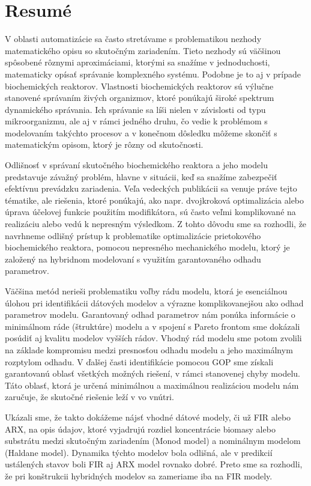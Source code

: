 \chapter{Resumé}
V oblasti automatizácie sa často stretávame s problematikou nezhody matematického opisu so skutočným zariadením. Tieto nezhody sú väčšinou spôsobené rôznymi aproximáciami, ktorými sa snažíme v jednoduchosti, matematicky opísať správanie komplexného systému. Podobne je to aj v prípade biochemických reaktorov. Vlastnosti biochemických reaktorov sú výlučne stanovené správaním živých organizmov, ktoré ponúkajú široké spektrum dynamického správania. Ich správanie sa líši nielen v závislosti od typu mikroorganizmu, ale aj v rámci jedného druhu, čo vedie k problémom s modelovaním takýchto procesov a v konečnom dôsledku môžeme skončiť s matematickým opisom, ktorý je rôzny od skutočnosti. 

Odlišnosť v správaní skutočného biochemického reaktora a jeho modelu predstavuje závažný problém, hlavne v situácii, keď sa snažíme zabezpečiť efektívnu prevádzku zariadenia. Veľa vedeckých publikácii sa venuje práve tejto tématike, ale riešenia, ktoré ponúkajú, ako napr. dvojkroková optimalizácia alebo úprava účelovej funkcie použitím modifikátora, sú často veľmi komplikované na realizáciu alebo vedú k nepresným výsledkom. Z tohto dôvodu sme sa rozhodli, že navrhneme odlišný prístup k problematike optimalizácie prietokového biochemického reaktora, pomocou nepresného mechanického modelu, ktorý je založený na hybridnom modelovaní s využitím garantovaného odhadu parametrov.

Väčšina metód nerieši problematiku voľby rádu modelu, ktorá je esenciálnou úlohou pri identifikácii dátových modelov a výrazne komplikovanejšou ako odhad parametrov modelu. Garantovaný odhad parametrov nám ponúka informácie o minimálnom ráde (štruktúre) modelu a v spojení s Pareto frontom sme dokázali posúdiť aj kvalitu modelov vyšších rádov. Vhodný rád modelu sme potom zvolili na základe kompromisu medzi presnosťou odhadu modelu a jeho maximálnym rozptylom odhadu. V ďalšej časti identifikácie pomocou GOP sme získali garantovanú oblasť všetkých možných riešení, v rámci stanovenej chyby modelu. Táto oblasť, ktorá je určená minimálnou a maximálnou realizáciou modelu nám zaručuje, že skutočné riešenie leží v vo vnútri.  

Ukázali sme, že takto dokážeme nájsť vhodné dátové modely, či už FIR alebo ARX, na opis údajov, ktoré vyjadrujú rozdiel koncentrácie biomasy alebo substrátu medzi skutočným zariadením (Monod model) a nominálnym modelom (Haldane model). Dynamika týchto modelov bola odlišná, ale v predikcií ustálených stavov boli FIR aj ARX model rovnako dobré. Preto sme sa rozhodli, že pri konštrukcii hybridných modelov sa zameriame iba na FIR modely.

